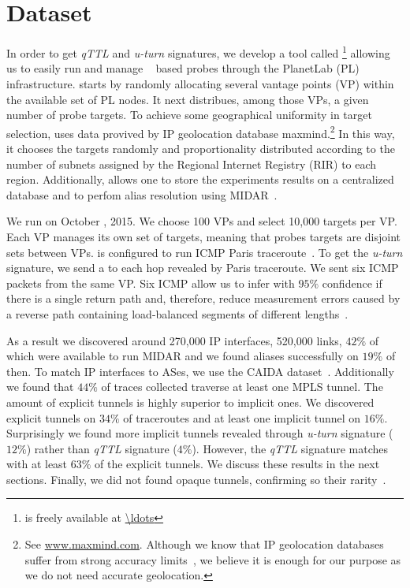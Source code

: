 \section{Dataset}\label{dataset}
In order to get \textit{qTTL} and \textit{u-turn} signatures, we develop a tool
called \magallanes\footnote{\magallanes is freely available at \url{\ldots}}
allowing us to easily run and manage \scamper~\cite{Luckie10} based probes
through the PlanetLab (PL) infrastructure.  \magallanes starts by randomly
allocating several vantage points (VP) within the available set of PL nodes.  It
next distribues, among those VPs, a given number of probe targets.
To achieve some geographical uniformity in target selection, \magallanes uses
data provived by IP geolocation database maxmind.\footnote{See
\url{www.maxmind.com}.  Although we know that IP geolocation databases suffer
from strong accuracy limits~\cite{geolocation}, we believe it is enough for our
purpose as we do not need accurate geolocation.}  In this way, it chooses the
targets randomly and proportionality distributed according to the number of
subnets assigned by the Regional Internet Registry (RIR) to each region.
Additionally, \magallanes allows one to store the experiments results on a
centralized database and to perfom alias resolution using MIDAR~\cite{Keys13}.

We run \magallanes on October , 2015.  We choose 100 VPs and select
10,000 targets per VP.  Each VP manages its own set of targets, meaning that
probes targets are disjoint sets between VPs.  \scamper is configured to run
ICMP Paris traceroute~\cite{BRICE06}.  To get the \textit{u-turn} signature,
we send a \ping to each hop revealed by Paris traceroute. We sent six
ICMP \echorequest packets from the same VP.  Six ICMP \echoreply allow us to
infer with $95\%$ confidence if there is a single return path and, 
therefore, reduce measurement errors caused by a reverse path containing
load-balanced segments of different lengths~\cite{BRICE07}. 

As a result we discovered around 270,000 IP interfaces,  520,000 links, $42\%$
of which were available to run MIDAR and we found aliases successfully on $19\%$
of then. To match IP interfaces to ASes, we use the CAIDA
dataset~\cite{caida_ref}.  Additionally we found that $44\%$ of traces collected
traverse at least one MPLS tunnel.  The amount of explicit tunnels is highly
superior to implicit ones. We discovered explicit tunnels on $34\%$ of
traceroutes and at least one implicit tunnel on $16\%$. Surprisingly we found
more implicit tunnels revealed through \textit{u-turn} signature ($12\%$) rather
than \textit{qTTL} signature ($4\%$). However, the \textit{qTTL} signature
matches with at least $63\%$ of the explicit tunnels. We discuss these results
in the next sections. Finally, we did not found opaque tunnels, confirming so
their rarity~\cite{VAN2013}.
